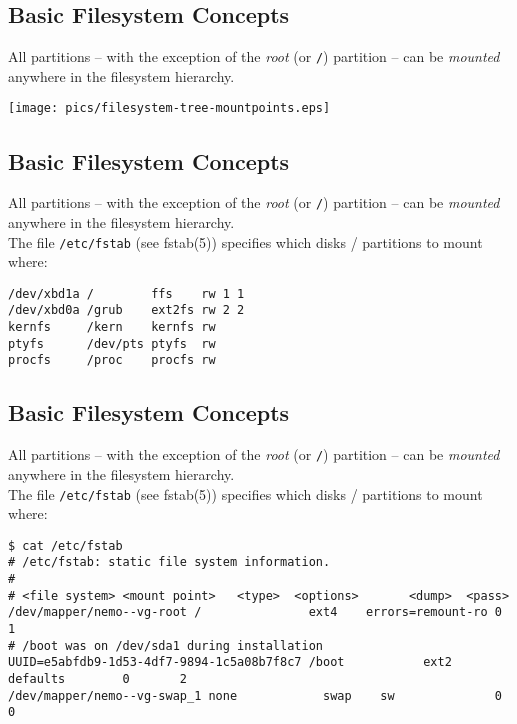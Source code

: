 \documentclass[xga]{xdvislides}
\begin{document}
\subsection{Basic Filesystem Concepts}
All partitions -- with the exception of the {\em root} (or \verb+/+) partition
-- can be {\em mounted} anywhere in the filesystem hierarchy.
\\

\begin{center}
	\texttt{[image: pics/filesystem-tree-mountpoints.eps]} \\
\end{center}

\subsection{Basic Filesystem Concepts}
All partitions -- with the exception of the {\em root} (or \verb+/+) partition
-- can be {\em mounted} anywhere in the filesystem hierarchy.
\\

The file \verb+/etc/fstab+ (see fstab(5)) specifies which disks / partitions
to mount where:
\\
\begin{verbatim}
/dev/xbd1a /        ffs    rw 1 1
/dev/xbd0a /grub    ext2fs rw 2 2
kernfs     /kern    kernfs rw
ptyfs      /dev/pts ptyfs  rw
procfs     /proc    procfs rw
\end{verbatim}
\Normalsize

\subsection{Basic Filesystem Concepts}
All partitions -- with the exception of the {\em root} (or \verb+/+) partition
-- can be {\em mounted} anywhere in the filesystem hierarchy.
\\

The file \verb+/etc/fstab+ (see fstab(5)) specifies which disks / partitions
to mount where:
\\
\begin{verbatim}
$ cat /etc/fstab
# /etc/fstab: static file system information.
#
# <file system> <mount point>   <type>  <options>       <dump>  <pass>
/dev/mapper/nemo--vg-root /               ext4    errors=remount-ro 0       1
# /boot was on /dev/sda1 during installation
UUID=e5abfdb9-1d53-4df7-9894-1c5a08b7f8c7 /boot           ext2    defaults        0       2
/dev/mapper/nemo--vg-swap_1 none            swap    sw              0       0
\end{verbatim}
\end{document}
